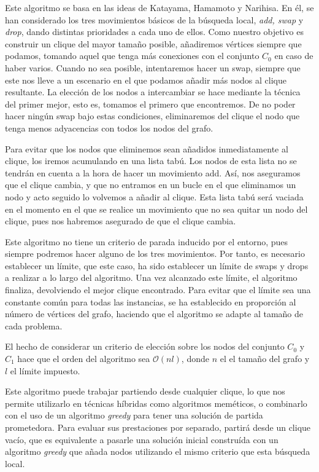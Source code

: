 Este algoritmo se basa en las ideas de Katayama, Hamamoto y Narihisa. En él, se han considerado
los tres movimientos básicos de la búsqueda local, \textit{add, swap} y \textit{drop}, dando
distintas prioridades a cada uno de ellos. Como nuestro objetivo es construir un clique del
mayor tamaño posible, añadiremos vértices siempre que podamos, tomando aquel que tenga más
conexiones con el conjunto $C_0$ en caso de haber varios. Cuando no sea posible, intentaremos
hacer un swap, siempre que este nos lleve a un escenario en el que podamos añadir más nodos
al clique resultante. La elección de los nodos a intercambiar se hace mediante la técnica del
primer mejor, esto es, tomamos el primero que encontremos. De no poder hacer ningún swap bajo
estas condiciones, eliminaremos del clique el nodo que tenga menos adyacencias con todos los
nodos del grafo.

Para evitar que los nodos que eliminemos sean añadidos inmediatamente al clique, los iremos
acumulando en una lista tabú. Los nodos de esta lista no se tendrán en cuenta a la hora de
hacer un movimiento add. Así, nos aseguramos que el clique cambia, y que no entramos en
un bucle en el que eliminamos un nodo y acto seguido lo volvemos a añadir al clique.
Esta lista tabú será vaciada en el momento en el que se realice un movimiento que no sea
quitar un nodo del clique, pues nos habremos asegurado de que el clique cambia.

Este algoritmo no tiene un criterio de parada inducido por el entorno, pues siempre podremos
hacer alguno de los tres movimientos. Por tanto, es necesario establecer un límite, que este
caso, ha sido establecer un límite de swaps y drops a realizar a lo largo del algoritmo.
Una vez alcanzado este límite, el algoritmo finaliza, devolviendo el mejor clique encontrado.
Para evitar que el límite sea una constante común para todas las instancias, se ha establecido
en proporción al número de vértices del grafo, haciendo que el algoritmo se adapte al tamaño
de cada problema.

El hecho de considerar un criterio de elección sobre los nodos del conjunto $C_0$ y $C_1$ hace que
el orden del algoritmo sea $\mathcal{O}(nl)$, donde $n$ el el tamaño del grafo y $l$ el límite impuesto.

Este algoritmo puede trabajar partiendo desde cualquier clique, lo que nos permite utilizarlo en
técnicas híbridas como algoritmos meméticos, o combinarlo con el uso de un algoritmo \textit{greedy}
para tener una solución de partida prometedora. Para evaluar sus prestaciones por separado,
partirá desde un clique vacío, que es equivalente a pasarle una solución inicial construída
con un algoritmo \textit{greedy} que añada nodos utilizando el mismo criterio que esta búsqueda local.

